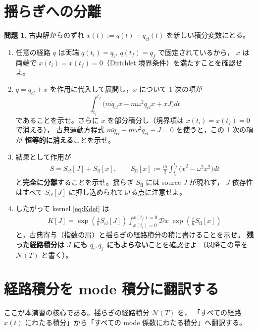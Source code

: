 \documentclass[dvipdfmx, uplatex]{jsarticle}
\theoremstyle{definition}
\newtheorem{prob}{問題}
\begin{document}
\section{揺らぎへの分離}

\begin{prob}\label{prob:split}
古典解からのずれ $x(t):=q(t)-q_{cl}(t)$ を新しい積分変数にとる。
\begin{enumerate}
\item 任意の経路 $q$ は両端 $q(t_i)=q_i,\ q(t_f)=q_f$ で固定されているから，
$x$ は両端で $x(t_i)=x(t_f)=0$（Dirichlet 境界条件）を満たすことを確認せよ。
\item $q=q_{cl}+x$ を作用に代入して展開し，$x$ について 1 次の項が
\[
    \int_{t_i}^{t_f}\!\big(m\dot q_{cl}\dot x-m\omega^2 q_{cl}x+xJ\big)dt
\]
であることを示せ。さらに $\dot x$ を部分積分し（境界項は $x(t_i)=x(t_f)=0$ で消える），
古典運動方程式 $m\ddot q_{cl}+m\omega^2 q_{cl}-J=0$ を使うと，この 1 次の項が
\textbf{恒等的に消える}ことを示せ。
\item 結果として作用が
\begin{align}
    S=S_{cl}[J]+S_{\text{fl}}[x],
    \qquad
    S_{\text{fl}}[x]:=\frac{m}{2}\int_{t_i}^{t_f}\!\big(\dot x^2-\omega^2 x^2\big)dt
\label{eq:Ssplit}
\end{align}
と\textbf{完全に分離}することを示せ。揺らぎ $S_{\text{fl}}$ には source $J$ が現れず，
$J$ 依存性はすべて $S_{cl}[J]$ に押し込められている点に注意せよ。
\item したがって kernel \eqref{eq:Kdef} は
\begin{align}
    K[J]
    =\exp\!\left(\frac{i}{\hbar}S_{cl}[J]\right)
    \int_{x(t_i)=0}^{x(t_f)=0}\!\mathcal{D}x\;
    \exp\!\left(\frac{i}{\hbar}S_{\text{fl}}[x]\right)
\label{eq:Kfactor}
\end{align}
と，古典寄与（指数の肩）と揺らぎの経路積分の積に書けることを示せ。
\textbf{残った経路積分は $J$ にも $q_i,q_f$ にもよらない}ことを確認せよ
（以降この量を $\mathcal{N}(T)$ と書く）。
\end{enumerate}
\end{prob}

\section{経路積分を mode 積分に翻訳する}
ここが本演習の核心である。揺らぎの経路積分 $\mathcal{N}(T)$ を，
「すべての経路 $x(t)$ にわたる積分」から「すべての mode 係数にわたる積分」へ翻訳する。
\end{document}
